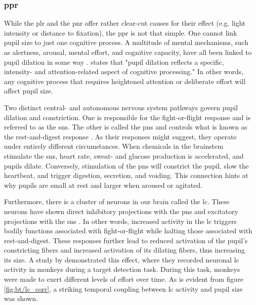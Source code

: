 \subsubsection{\acrfull{ppr}}

While the \acrshort{plr} and the \acrshort{pnr} offer rather clear-cut causes for their effect (e.g. light intensity or distance to fixation), the \acrshort{ppr} is not that simple. One cannot link pupil size to just one cognitive process. A multitude of mental mechanisms, such as alertness, arousal, mental effort, and cognitive capacity, have all been linked to pupil dilation in some way \cite{beatty1982, just2003, andreassi2000}. \textcite{eckstein2017} states that "pupil dilation reflects a specific, intensity- and attention-related aspect of cognitive processing."
In other words, any cognitive process that requires heightened attention or deliberate effort will affect pupil size.

Two distinct central- and autonomous nervous system pathways govern pupil dilation and constriction. One is responsible for the fight-or-flight response and is referred to as the \acrfull{sns}. The other is called the \acrfull{pns} and controls what is known as the rest-and-digest response \cite{blessing2008}. As their responses might suggest, they operate under entirely different circumstances. When chemicals in the brainstem stimulate the \acrshort{sns}, heart rate, sweat- and glucose production is accelerated, and pupils dilate. Conversely, stimulation of the \acrshort{pns} will constrict the pupil, slow the heartbeat, and trigger digestion, secretion, and voiding. This connection hints at why pupils are small at rest and larger when aroused or agitated.

Furthermore, there is a cluster of neurons in our brain called the \acrfull{lc}. These neurons have shown direct inhibitory projections with the \acrshort{pns} and excitatory projections with the \acrshort{sns} \cite{eckstein2017}. In other words, increased activity in the \acrshort{lc} triggers bodily functions associated with fight-or-flight while halting those associated with rest-and-digest. These responses further lead to reduced activation of the pupil's constricting fibers and increased activation of its dilating fibers, thus increasing its size. A study by \textcite{rajkowski1993} demonstrated this effect, where they recorded neuronal \acrshort{lc} activity in monkeys during a target detection task. During this task, monkeys were made to exert different levels of effort over time. As is evident from figure \ref{fig:bt/lc_corr}, a striking temporal coupling between \acrshort{lc} activity and pupil size was shown. 

